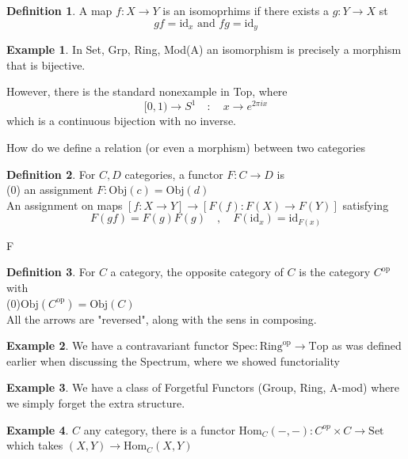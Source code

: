 \documentclass{article}
\theoremstyle{definition}
\newtheorem{example}{Example}[section]
\theoremstyle{definition}
\newtheorem{definition}{Definition}[section]
\theoremstyle{remark}
\begin{document}
\begin{definition}
	A map $f:X \to Y$ is an isomoprhims if there exists a $g: Y \to X$ st
	\[gf = \text{id}_x \text{ and } fg = \text{id}_y\]
\end{definition}

\begin{example}
In Set, Grp, Ring, Mod(A) an isomorphism is precisely a morphism that is bijective.	
\end{example}

However, there is the standard nonexample in Top, where 
\[[0,1) \to S^1 \quad : \quad x \to e^{2 \pi i x}\]
which is a continuous bijection with no inverse.

How do we define a relation (or even a morphism) between two categories

\begin{definition}
	For $C,D$ categories, a functor $F: C \to D$ is \\
\indent (0) an assignment $F: \text{Obj}(c) = \text{Obj}(d)$\\
\indent An assignment on maps $[f:X \to Y] \to [F(f): F(X) \to F(Y)]$ satisfying\\
\[F(gf) = F(g)F(g) \quad, \quad F(\text{id}_x) = \text{id}_{F(x)}\]

\end{definition}

F
\begin{definition}
	For $C$ a category, the opposite category of $C$ is the category $C^{\text{op}}$ with\\
	\indent (0)$\text{Obj}(C^{\text{op}}) = \text{Obj}(C)$\\
	\indent All the arrows are "reversed", along with the sens in composing.
\end{definition}

\begin{example}
	We have a contravariant functor $\text{Spec}: \text{Ring}^{\text{op}} \to \text{Top}$
	as was defined earlier when discussing the Spectrum, where we showed functoriality
\end{example}

\begin{example}
	We have a class of Forgetful Functors (Group, Ring, A-mod) where we simply forget the extra structure.
\end{example}

\begin{example}
	$C$ any category, there is a functor $\text{Hom}_C(-,-): C^{op} \times C \to \text{Set}$
	which takes $(X,Y) \to \text{Hom}_C(X,Y)$
\end{example}
\end{document}

